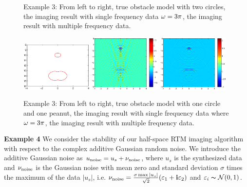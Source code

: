 \documentclass[12pt]{iopart}
\begin{document}
{\begin{figure}
	\caption{Example 3: From left to right,  true obstacle model with two circles, the imaging result
		with single frequency data $\omega=3\pi$, the imaging result with multiple frequency data.}\label{figure_31}
\end{figure}

\begin{figure}
	\centering
	\includegraphics[width=0.32\textwidth,height=0.16\textheight]{./graphic/circle_0_4_peanut_1_profile.eps}
	\includegraphics[width=0.32\textwidth]{./graphic/circle_0_4_peanut_1_3pi_1.eps}
	\includegraphics[width=0.32\textwidth]{./graphic/circle_0_4_peanut_1_multi_1.eps}
	
	\caption{Example 3: From left to right,  true obstacle model with one circle and one peanut, the imaging result
		with single frequency data where $\omega=3\pi$, the imaging result with multiple frequency data.}\label{figure_32}
\end{figure}

\bigskip
\textbf{Example 4}
We consider the stability of our half-space RTM imaging
algorithm with respect to the complex additive Gaussian random noise. We introduce
the additive Gaussian noise as $u_{\rm noise}=u_s+\nu_{\rm noise}$,
where $u_s$ is the synthesized data and $\nu_{\rm noise}$ is the Gaussian noise with mean zero and standard deviation $\sigma$ times the maximum of  the data $|u_s|$, i.e. $\nu_{\rm noise}=\frac{\sigma \max |u_s|}{\sqrt{2}}(\varepsilon_1+\mathbf{i}\varepsilon_2)$ and $\varepsilon_i\thicksim \mathcal{N}(0,1)$.

}
\end{document}
